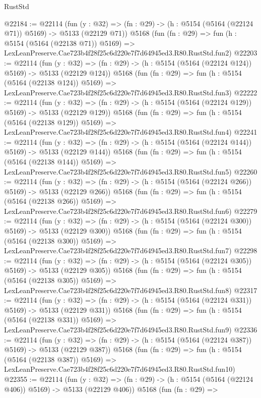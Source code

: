 \begin{lexlean}{RustStd}
\begin{coremodule}
@22184 := @22114
    (fun (y : @32) => (fn : @29) -> (h : @5154 (@5164 (@22124 @71)) @5169) -> @5133 (@22129 @71))
    @5168
    (fun (fn : @29) =>
    fun (h : @5154 (@5164 (@22138 @71)) @5169) =>
    LexLeanPreserve.Cae723b4f28f25c6d220e7f7d64945ed3.R80.RustStd.fun2)
@22203 := @22114
    (fun (y : @32) => (fn : @29) -> (h : @5154 (@5164 (@22124 @124)) @5169) -> @5133 (@22129 @124))
    @5168
    (fun (fn : @29) =>
    fun (h : @5154 (@5164 (@22138 @124)) @5169) =>
    LexLeanPreserve.Cae723b4f28f25c6d220e7f7d64945ed3.R80.RustStd.fun3)
@22222 := @22114
    (fun (y : @32) => (fn : @29) -> (h : @5154 (@5164 (@22124 @129)) @5169) -> @5133 (@22129 @129))
    @5168
    (fun (fn : @29) =>
    fun (h : @5154 (@5164 (@22138 @129)) @5169) =>
    LexLeanPreserve.Cae723b4f28f25c6d220e7f7d64945ed3.R80.RustStd.fun4)
@22241 := @22114
    (fun (y : @32) => (fn : @29) -> (h : @5154 (@5164 (@22124 @144)) @5169) -> @5133 (@22129 @144))
    @5168
    (fun (fn : @29) =>
    fun (h : @5154 (@5164 (@22138 @144)) @5169) =>
    LexLeanPreserve.Cae723b4f28f25c6d220e7f7d64945ed3.R80.RustStd.fun5)
@22260 := @22114
    (fun (y : @32) => (fn : @29) -> (h : @5154 (@5164 (@22124 @266)) @5169) -> @5133 (@22129 @266))
    @5168
    (fun (fn : @29) =>
    fun (h : @5154 (@5164 (@22138 @266)) @5169) =>
    LexLeanPreserve.Cae723b4f28f25c6d220e7f7d64945ed3.R80.RustStd.fun6)
@22279 := @22114
    (fun (y : @32) => (fn : @29) -> (h : @5154 (@5164 (@22124 @300)) @5169) -> @5133 (@22129 @300))
    @5168
    (fun (fn : @29) =>
    fun (h : @5154 (@5164 (@22138 @300)) @5169) =>
    LexLeanPreserve.Cae723b4f28f25c6d220e7f7d64945ed3.R80.RustStd.fun7)
@22298 := @22114
    (fun (y : @32) => (fn : @29) -> (h : @5154 (@5164 (@22124 @305)) @5169) -> @5133 (@22129 @305))
    @5168
    (fun (fn : @29) =>
    fun (h : @5154 (@5164 (@22138 @305)) @5169) =>
    LexLeanPreserve.Cae723b4f28f25c6d220e7f7d64945ed3.R80.RustStd.fun8)
@22317 := @22114
    (fun (y : @32) => (fn : @29) -> (h : @5154 (@5164 (@22124 @331)) @5169) -> @5133 (@22129 @331))
    @5168
    (fun (fn : @29) =>
    fun (h : @5154 (@5164 (@22138 @331)) @5169) =>
    LexLeanPreserve.Cae723b4f28f25c6d220e7f7d64945ed3.R80.RustStd.fun9)
@22336 := @22114
    (fun (y : @32) => (fn : @29) -> (h : @5154 (@5164 (@22124 @387)) @5169) -> @5133 (@22129 @387))
    @5168
    (fun (fn : @29) =>
    fun (h : @5154 (@5164 (@22138 @387)) @5169) =>
    LexLeanPreserve.Cae723b4f28f25c6d220e7f7d64945ed3.R80.RustStd.fun10)
@22355 := @22114
    (fun (y : @32) => (fn : @29) -> (h : @5154 (@5164 (@22124 @406)) @5169) -> @5133 (@22129 @406))
    @5168
    (fun (fn : @29) =>

\end{coremodule}
\end{lexlean}

